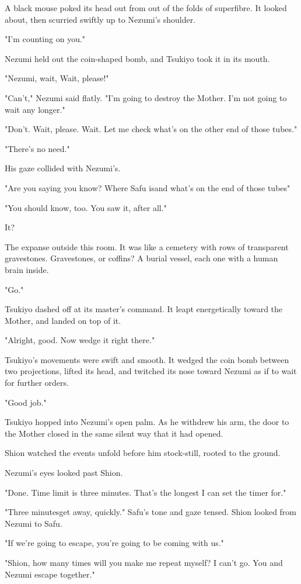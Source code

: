 A black mouse poked its head out from out of the folds of superfibre. It
looked about, then scurried swiftly up to Nezumi's shoulder.

"I'm counting on you."

Nezumi held out the coin-shaped bomb, and Tsukiyo took it in its mouth.

"Nezumi, wait, Wait, please!"

"Can't," Nezumi said flatly. "I'm going to destroy the Mother. I'm not
going to wait any longer."

"Don't. Wait, please. Wait. Let me check what's on the other end of
those tubes."

"There's no need."

His gaze collided with Nezumi's.

"\el Are you saying you know? Where Safu is\el and what's on the end of
those tubes\el "

"You should know, too. You saw it, after all."

It?

The expanse outside this room. It was like a cemetery with rows of
transparent gravestones. Gravestones, or coffins? A burial vessel, each
one with a human brain inside.

"Go."

Tsukiyo dashed off at its master's command. It leapt energetically
toward the Mother, and landed on top of it.

"Alright, good. Now wedge it right there."

Tsukiyo's movements were swift and smooth. It wedged the coin bomb
between two projections, lifted its head, and twitched its nose toward
Nezumi as if to wait for further orders.

"Good job."

Tsukiyo hopped into Nezumi's open palm. As he withdrew his arm, the door
to the Mother closed in the same silent way that it had opened.

Shion watched the events unfold before him stock-still, rooted to the
ground.

Nezumi's eyes looked past Shion.

"Done. Time limit is three minutes. That's the longest I can set the
timer for."

"Three minutes\el get away, quickly." Safu's tone and gaze tensed. Shion
looked from Nezumi to Safu.

"If we're going to escape, you're going to be coming with us."

"Shion, how many times will you make me repeat myself? I can't go. You
and Nezumi escape together."

